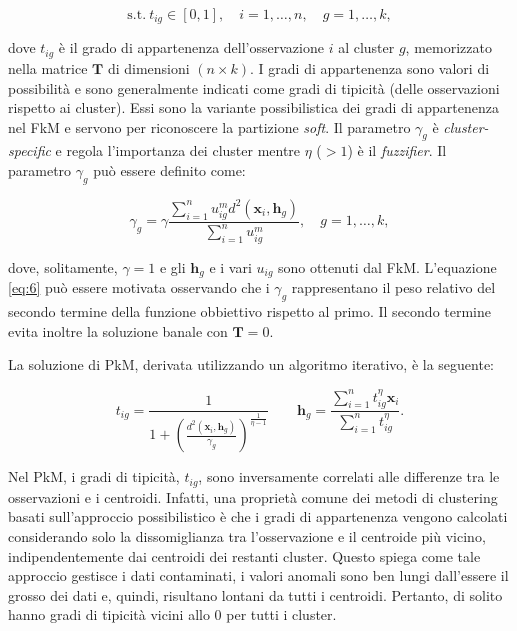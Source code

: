 \documentclass[12pt]{article}
\begin{document}
\begin{equation}
	\textrm{s.t.} \ t_{ig} \in [0,1], \quad i=1, \dots,n, \quad g=1, \dots,k,	
	\label{eq:5}
\end{equation}

dove $t_{ig}$ è il grado di appartenenza dell'osservazione $i$ al cluster $g$, memorizzato nella matrice $\mathbf{T}$ di dimensioni $(n \times k)$. I gradi di appartenenza sono valori di possibilità e sono generalmente indicati come gradi di tipicità (delle osservazioni rispetto ai cluster). Essi sono la variante possibilistica dei gradi di appartenenza nel FkM e servono per riconoscere la partizione \textit{soft}. Il parametro $\gamma_g$ è \textit{cluster-specific} e regola l'importanza dei cluster mentre $\eta$ ($> 1$) è il \textit{fuzzifier}. Il parametro $\gamma_g$ può essere definito come:

\begin{equation}
	\gamma_g = \gamma \frac{\sum_{i=1}^{n} u_{ig}^m d^2(\mathbf{x}_{i},\mathbf{h}_{g})}{\sum_{i=1}^{n} u_{ig}^m}, \quad g=1, \dots,k,
	\label{eq:6}
\end{equation}

dove, solitamente, $\gamma = 1$ e gli $\mathbf{h}_{g}$ e i vari $u_{ig}$ sono ottenuti dal FkM. L'equazione \eqref{eq:6} può essere motivata osservando che i $\gamma_g$ rappresentano il peso relativo del secondo termine della funzione obbiettivo rispetto al primo. Il secondo termine evita inoltre la soluzione banale con $\mathbf{T} = 0$.

La soluzione di PkM, derivata utilizzando un algoritmo iterativo, è la seguente:

\begin{equation}
	t_{ig}=\frac{1}{1+\left(\frac{d^2(\mathbf{x}_{i},\mathbf{h}_{g})}{\gamma_g}\right)^{\frac{1}{\eta-1}}}
	\qquad
	\mathbf{h}_{g}=\frac{\sum_{i=1}^{n} t_{ig}^{\eta}\mathbf{x}_{i}}{\sum_{i=1}^{n} t_{ig}^{\eta}}.
	\label{eq:7}
\end{equation}

Nel PkM, i gradi di tipicità, $t_{ig}$, sono inversamente correlati alle differenze tra le osservazioni e i centroidi. Infatti, una proprietà comune dei metodi di clustering basati sull'approccio possibilistico è che i gradi di appartenenza vengono calcolati considerando solo la dissomiglianza tra l'osservazione e il centroide più vicino, indipendentemente dai centroidi
dei restanti cluster. Questo spiega come tale approccio gestisce i dati contaminati, i valori anomali sono ben lungi dall'essere il grosso dei dati e, quindi, risultano lontani da tutti i centroidi. Pertanto, di solito hanno gradi di tipicità vicini allo 0 per tutti i cluster.
\end{document}
